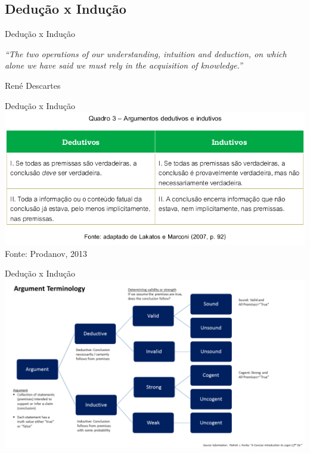 \documentclass{beamer}
\begin{document}
\subsection{Dedução x Indução}

\begin{frame}{Dedução x Indução}
  \begin{block}{}
    \small
    {\em ``The two operations of our understanding, intuition and deduction,
    on which alone we have said we must rely in the acquisition of
    knowledge.''}

    \scriptsize
    \hfill René Descartes
  \end{block}
\end{frame}

\begin{frame}{Dedução x Indução}
\includegraphics[width=1.05\textwidth]{Metodos/deducao_vs_inducao}
  \vfill
  \tiny
  \hfill Fonte: Prodanov, 2013
\end{frame}

\begin{frame}{Dedução x Indução}
\includegraphics[width=1.2\textwidth]{Metodos/Argument_terminology_used_in_logic}
\end{frame}
\end{document}
